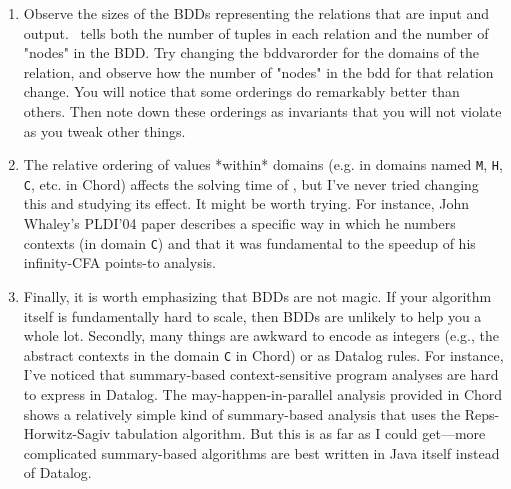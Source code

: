 \begin{enumerate}
\item
Observe the sizes of the BDDs representing the relations that are
input and output.  \bddbddb\ tells both the number of tuples in each
relation and the number of "nodes" in the BDD.  Try changing the
bddvarorder for the domains of the relation, and observe how the
number of "nodes" in the bdd for that relation change.  You will
notice that some orderings do remarkably better than others.  Then
note down these orderings as invariants that you will not violate as
you tweak other things.

\item
The relative ordering of values *within* domains (e.g.
in domains named \verb+M+, \verb+H+, \verb+C+, etc. in Chord) affects the
solving time of \bddbddb, but
I've never tried changing this and studying its effect.  It might be
worth trying.  For instance, John Whaley's PLDI'04 paper describes a
specific way in which he numbers contexts (in domain \verb+C+) and that it was
fundamental to the speedup of his infinity-CFA points-to analysis.

\item
Finally, it is worth emphasizing that BDDs are not magic.
If your algorithm itself is fundamentally hard to scale, then BDDs are
unlikely to help you a whole lot.  Secondly, many things are awkward to
encode as integers (e.g., the abstract contexts in the domain \verb+C+ 
in Chord) or as Datalog rules.
For instance, I've noticed that summary-based context-sensitive program
analyses are hard to express in Datalog.  The may-happen-in-parallel
analysis provided in Chord shows a relatively simple kind of summary-based
analysis that uses the Reps-Horwitz-Sagiv tabulation algorithm.  But this
is as far as I could get---more complicated summary-based algorithms are
best written in Java itself instead of Datalog.
\end{enumerate}

